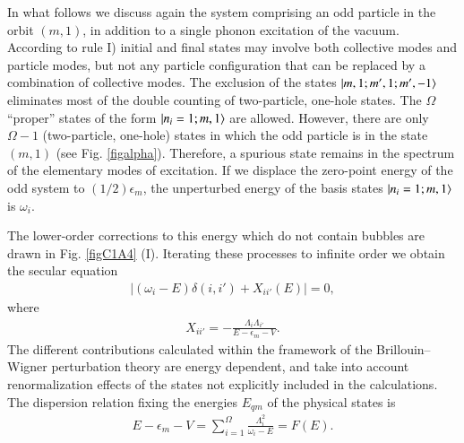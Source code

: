 In what follows we discuss again the system comprising an odd particle in the orbit $(m, 1)$, in addition to a single phonon excitation of the vacuum. 
According to rule I) initial and final states may involve both collective modes and particle modes, but not any particle configuration that can be replaced by a combination of collective modes. The exclusion of the states $|{m,1; m',1;m',-1} \rangle$ eliminates most of the double counting of two-particle, one-hole states. The $\Omega$ ``proper'' states of the form $|{n_i=1;m,1} \rangle$ are allowed. However, 
there are only $\Omega-1$ (two-particle, one-hole) states in which the odd particle is in the state $(m, 1)$ (see Fig. \ref{figalpha}). Therefore, a spurious state remains in the spectrum of the elementary modes of excitation. If we displace the zero-point energy of the odd system to $(1/2)\epsilon_m$, the unperturbed energy of the basis states $|{n_i=1;m,1} \rangle$ is $\omega_i$.


The lower-order corrections to this energy which do not contain bubbles 
are drawn in Fig. \ref{figC1A4} (I). Iterating these processes to infinite order we obtain the secular equation 
  \begin{align}\label{eqC1A56} 
\left|(\omega_i-E)\delta(i,i')+X_{ii'}(E)\right|=0,
  \end{align}   
  where
    \begin{align}\label{eqC1A57} 
   X_{ii'}=-\frac{\Lambda_i\Lambda_{i'}}{E-\epsilon_m-V}.
    \end{align} 
The different contributions calculated within the framework of the Brillouin--Wigner perturbation theory are energy dependent, and take into account renormalization effects of the states not explicitly included in the calculations. The dispersion relation fixing the energies $E_{qm}$ of the physical states is
  \begin{align}\label{eqC1A60} 
 E-\epsilon_m-V=\sum_{i=1}^{\Omega}\frac{\Lambda_i^2}{\omega_i-E}=F(E).
  \end{align} 


